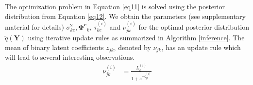 \documentclass[runningheads]{llncs}
\begin{document}
%
The optimization problem in Equation \eqref{eq11} is solved using the posterior distribution from Equation \eqref{eq12}. We obtain the parameters (see supplementary material for details) $\sigma_{ke}^2, \mathbf{\Phi^e}_k$, $\tau_{ke}^{(i)}$ and $\nu_{jk}^{(i)}$ for the optimal posterior distribution $\tilde{q}(\mathbf{Y})$ using iterative update rules as summarized in Algorithm \ref{inference}. 
The mean of binary latent coefficients $z_{jk}$, denoted by $\nu_{jk}$, has an update rule which will lead to several interesting observations.
%
\begin{align}
\nu_{jk}^{(i)} &= \frac{L_k^{(i)}}{1+e^{-\zeta_{jk}^{(i)}}}  \label{eq24}
\end{align}
\end{document}
